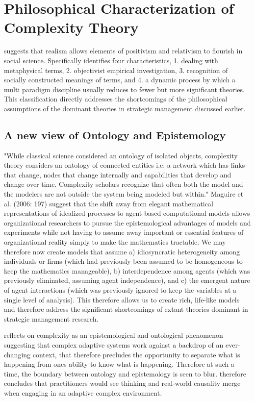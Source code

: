 \documentclass[12pt,letterpaper]{article}
\begin{document}
\section{Philosophical Characterization of Complexity Theory}\label{S:PhilosophicalFoundationComplexity}
 \cite{Mckelvey2011} suggests that realism allows elements of positivism and relativism to flourish in social science. Specifically \cite{Mckelvey2011} identifies four characteristics, 1. dealing with metaphysical terms, 2. objectivist empirical investigation, 3. recognition of socially constructed meanings of terms, and 4. a dynamic process by which a multi paradigm discipline usually reduces to fewer but more significant theories. This classification directly addresses the shortcomings of the philosophical assumptions of the dominant theories in strategic management discussed earlier.

\subsection{A new view of Ontology and Epistemology}

"While classical science considered an ontology of isolated objects, complexity theory considers an ontology of connected entities i.e. a network which has links that change, nodes that change internally and capabilities that develop and change over time.  Complexity scholars recognize that often both the model and the modelers are not outside the system being modeled but within." Maguire et al. (2006: 197) suggest that the shift away from elegant mathematical representations of idealized processes to agent-based computational models allows organizational researchers to pursue the epistemological advantages of models and experiments while not having to assume away important or essential features of organizational reality simply to make the mathematics tractable. We may therefore now create models that assume a) idiosyncratic heterogeneity among individuals or firms (which had previously been assumed to be homogeneous to keep the mathematics manageable), b) interdependence among agents (which was previously eliminated, assuming agent independence), and c) the emergent nature of agent interactions (which was previously ignored to keep the variables at a single level of analysis). This therefore allows us to create rich, life-like models and therefore address the significant shortcomings of extant theories dominant in strategic management research.

\cite{Eoyang2011} reflects on complexity as an epistemological and ontological phenomenon suggesting that complex adaptive systems work against a backdrop of an ever-changing context, that therefore precludes the opportunity to separate what is happening from one\textquotesingle s ability to know what is happening. Therefore at such a time, the boundary between ontology and epistemology is seen to blur. \cite{Eoyang2011} therefore concludes that practitioners would see thinking and real-world causality merge when engaging in an adaptive complex environment.
\end{document}
